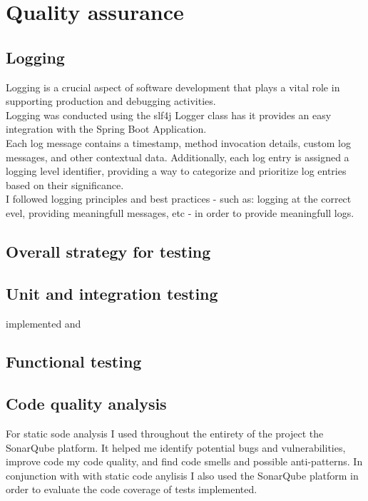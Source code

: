 \documentclass[12pt]{article}
\begin{document}
\section{Quality assurance}

\subsection{Logging}

Logging is a crucial aspect of software development that plays a vital role in supporting production and debugging activities. \\
Logging was conducted using the slf4j Logger class has it provides an easy integration with the Spring Boot Application.\\
Each log message contains a timestamp, method invocation details, custom log messages, and other contextual data. Additionally, each log entry is assigned a logging level identifier, providing a way to categorize and prioritize log entries based on their significance.\\
I followed logging principles and best practices - such as: logging at the correct evel, providing meaningfull messages, etc - in order to provide meaningfull logs.

\subsection{Overall strategy for testing}


\subsection{Unit and integration testing}

implemented and 

\subsection{Functional testing}

\subsection{Code quality analysis}

For static sode analysis I used throughout the entirety of the project the SonarQube platform. It helped me identify potential bugs and vulnerabilities, improve code my code quality, and find code smells and possible anti-patterns. In conjunction with with static code anylisis I also used the SonarQube platform in order to evaluate the code coverage of tests implemented.
\end{document}
